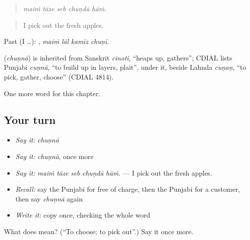 \begin{quote}
    
\end{quote}

\begin{quote}
\emph{maiṁ tāze seb chuṇdā hāṁ.}
\end{quote}

\begin{quote}
I pick out the fresh apples.
\end{quote}

Past (I …):    , \emph{maiṁ lāl kamīz chuṇī}.

\begin{cousinweb}
\textbf{} (\emph{chuṇnā}) is inherited from Sanskrit \emph{cinoti}, \textquotedblleft{}heaps up, gathers\textquotedblright{}; CDIAL lists Punjabi \emph{cuṇnā}, \textquotedblleft{}to build up in layers, plait\textquotedblright{}, under it, beside Lahnda \emph{cuṇaṇ}, \textquotedblleft{}to pick, gather, choose\textquotedblright{} (CDIAL 4814).
\end{cousinweb}

\begin{grammarlens}[title={What you've built}]
One more word for this chapter.
\end{grammarlens}

\subsection*{Your turn}
\begin{itemize}
\raggedright
  \item \emph{Say it:} \emph{chuṇnā}
  \item \emph{Say it:} \emph{chuṇnā}, once more
  \item \emph{Say it:} \emph{maiṁ tāze seb chuṇdā hāṁ.} — I pick out the fresh apples.
  \item \emph{Recall:} say the Punjabi for free of charge, then the Punjabi for a customer, then say \emph{chuṇnā} again
  \item \emph{Write it:} copy \textbf{} once, checking the whole word
\end{itemize}

\begin{tcolorbox}[breakable,colback=teal!4,colframe=teal!35!black,title={Before you move on}]
What does  mean? (\textquotedblleft{}To choose; to pick out\textquotedblright{}.) Say it once more.
\end{tcolorbox}
